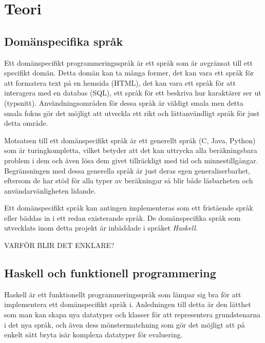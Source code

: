 
\chapter{Teori}

\section{Domänspecifika språk}
\begin{draft}
  Ett domänspecifikt programmeringsspråk är ett språk som är avgränsat till ett
  specifikt domän. Detta domän kan ta många former, det kan vara ett språk för
  att formatera text på en hemsida (HTML), det kan vara ett språk för att
  interagera med en databas (SQL), ett språk för ett beskriva hur karaktärer ser
  ut (typsnitt). Användningsområden för dessa språk är väldigt smala men
  detta smala fokus gör det möjligt att utveckla ett rikt och lättanvändligt
  språk för just detta område. 

  Motsatsen till ett domänspecifikt språk är ett generellt språk (C, Java,
  Python) som är turingkompletta, vilket betyder att det kan uttrycka alla
  beräkningsbara problem i dem och även lösa dem givet tillräckligt med tid och
  minnestillgångar. Begränsningen med dessa generella språk är just deras egen
  generaliserbarhet, eftersom de har stöd för alla typer av beräkningar så blir
  både läsbarheten och användarvänligheten lidande.
  
  Ett domänspecifikt språk kan antingen implementeras som ett fristående språk
  eller bäddas in i ett redan existerande språk. De domänspecifika språk som
  utvecklats inom detta projekt är inbäddade i språket \textit{Haskell}.
\end{draft}

\begin{binge}
VARFÖR BLIR DET ENKLARE? 
\end{binge}

\section{Haskell och funktionell programmering}

\begin{draft}
  Haskell är ett funktionellt programmeringsspråk som lämpar sig bra för att
  implementera ett domänspecifikt språk i. Anledningen till detta är den lätthet
  som man kan skapa nya datatyper och klasser för att representera grundstenarna
  i det nya språk, och även dess mönstermatchning som gör det möjligt att på
  enkelt sätt bryta isär komplexa datatyper för evaluering.
\end{draft}

